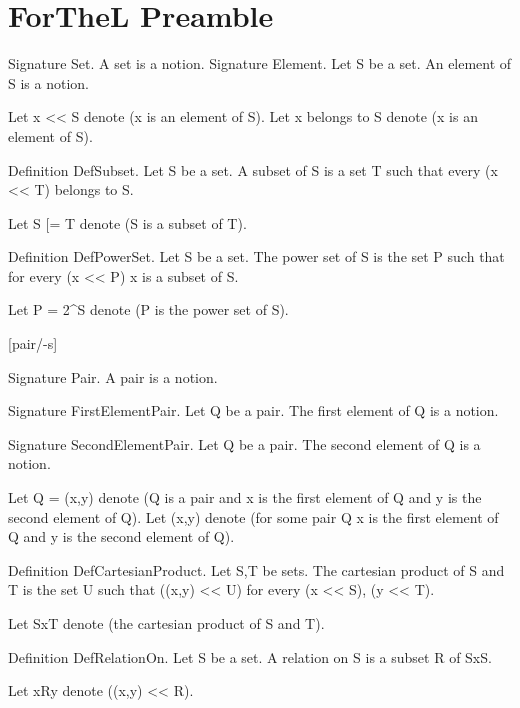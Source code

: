 \section*{ForTheL Preamble}

\begin{forthelfull}
[set/-s] [element/-s] [belong/-s]

Signature Set. A set is a notion.
Signature Element. 
    Let S be a set.
    An element of S is a notion.

Let x << S denote (x is an element of S).
Let x belongs to S denote (x is an element of S).

Definition DefSubset. 
    Let S be a set.
    A subset of S is a set T such that every (x << T) belongs to S.

Let S [= T denote (S is a subset of T).

Definition DefPowerSet. 
    Let S be a set.
    The power set of S is the set P such that
    for every (x << P) x is a subset of S.

Let P = 2^S denote (P is the power set of S).

[pair/-s]

Signature Pair. A pair is a notion.

Signature FirstElementPair.
    Let Q be a pair.
    The first element of Q is a notion.

Signature SecondElementPair.
    Let Q be a pair.
    The second element of Q is a notion.

Let Q = (x,y) denote (Q is a pair and x is the first element of Q and y is the second element of Q).
Let (x,y) denote (for some pair Q x is the first element of Q and y is the second element of Q).

Definition DefCartesianProduct. 
    Let S,T be sets.
    The cartesian product of S and T is the set U such that
    ((x,y) << U) for every (x << S), (y << T).

Let SxT denote (the cartesian product of S and T).

Definition DefRelationOn. 
    Let S be a set.
    A relation on S is a subset R of SxS.

Let xRy denote ((x,y) << R).
\end{forthelfull}
